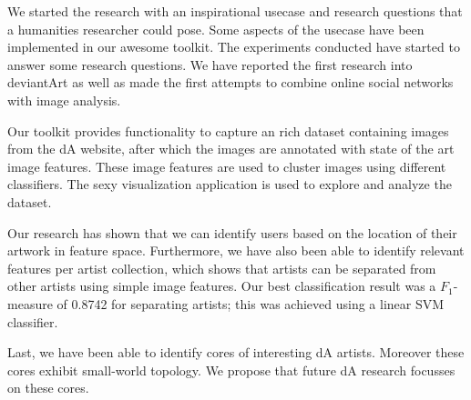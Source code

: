 We started the research with an inspirational usecase and research questions that a humanities researcher could pose.
Some aspects of the usecase have been implemented in our awesome toolkit. The experiments conducted have started to answer some research questions.
We have reported the first research into deviantArt as well as made the first attempts to combine online social networks with image analysis.

Our toolkit provides functionality to capture an rich dataset containing images from the dA website, after which the images are annotated with state of the art image features. These image features are used to cluster images using different classifiers. The sexy visualization application is used to explore and analyze the dataset.

Our research has shown that we can identify users based on the location of their artwork in feature space. Furthermore, we have also been able to identify relevant features per artist collection, which shows that artists can be separated from other artists using simple image features. Our best classification result was a $F_1$-measure of 0.8742 for separating artists; this was achieved using a linear SVM classifier.

Last, we have been able to identify cores of interesting dA artists. Moreover these cores exhibit small-world topology. We propose that future dA research focusses on these cores.

